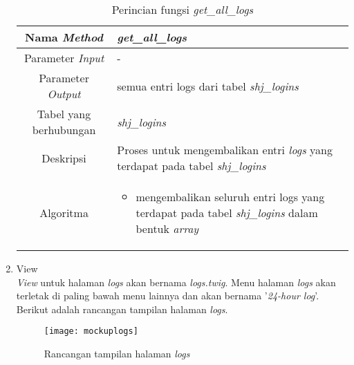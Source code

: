 \begin{enumerate}
	\begin{table}[H]
		\caption{Perincian fungsi \textit{get\_all\_logs}}
		\begin{tabular}{|c|p{11cm}|}
			\hline
			Nama \textit{Method} 	& 	\textit{get\_all\_logs} 	\\
			\hline
			Parameter \textit{Input} & - \\
			\hline
			Parameter \textit{Output} &  semua entri logs dari tabel \textit{shj\_logins}\\
			\hline
			Tabel yang berhubungan & \textit{shj\_logins} \\
			\hline
			Deskripsi	& Proses untuk mengembalikan entri \textit{logs} yang terdapat pada tabel \textit{shj\_logins} \\
			\hline
			Algoritma	& \begin{itemize}
				\item mengembalikan seluruh entri logs yang terdapat pada tabel \textit{shj\_logins} dalam bentuk \textit{array}
			\end{itemize} \\
			\hline
		\end{tabular}
	\end{table}

	\item View \\
	\textit{View} untuk halaman \textit{logs} akan bernama \textit{logs.twig}. Menu halaman \textit{logs} akan terletak di paling bawah menu lainnya dan akan bernama '\textit{24-hour log}'. Berikut adalah rancangan tampilan halaman \textit{logs}.
	
	\begin{figure}[H]
		\centering  
		\texttt{[image: mockuplogs]}  
		\caption[Rancangan tampilan halaman \textit{logs}]{Rancangan tampilan halaman \textit{logs}} 
		\label{fig:mockuplogs} 
	\end{figure}


\end{enumerate}
